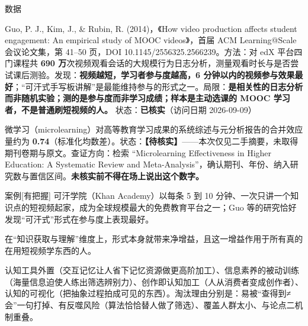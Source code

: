 \documentclass[prep,both]{debate}
\begin{document}
\begin{fields}
\begin{evidence}{数据}
\end{evidence}
\begin{bullets}
\item Guo, P. J., Kim, J., \& Rubin, R. (2014)，《How video production affects student engagement: An empirical study of MOOC videos》，首届 ACM Learning@Scale 会议论文集，第 41–50 页，DOI 10.1145/2556325.2566239。方法：对 edX 平台四门课程共 \textbf{690 万}次视频观看会话的大规模行为日志分析，测量观看时长与是否尝试课后测验。发现：\textbf{视频越短，学习者参与度越高，6 分钟以内的视频参与效果最好}；“可汗式手写板讲解”是最能维持参与的形式之一。局限：\textbf{是相关性的日志分析而非随机实验；测的是参与度而非学习成绩；样本是主动选课的 MOOC 学习者，不是普通刷短视频的人。} 状态：\textbf{已核实}（访问日期 2026-09-09）
\item 微学习（microlearning）对高等教育学习成果的系统综述与元分析报告的合并效应量约为 \textbf{0.74}（标准化均数差）。状态：\textbf{【待核实】}——本次仅见二手摘要，未取得期刊卷期与原文。查证方向：检索 “Microlearning Effectiveness in Higher Education: A Systematic Review and Meta-Analysis”，确认期刊、年份、纳入研究数与置信区间。\textbf{未核实前不得在场上说出这个数字。}
\end{bullets}
\begin{evidence}{案例}[有把握]
可汗学院（Khan Academy）以每条 5 到 10 分钟、一次只讲一个知识点的短视频起家，成为全球规模最大的免费教育平台之一；Guo 等的研究恰好发现“可汗式”形式在参与度上表现最好。
\end{evidence}
\closing[回扣判准]{在“知识获取与理解”维度上，形式本身就带来净增益，且这一增益作用于所有真的在用短视频学东西的人。}
\begin{clash}
\end{clash}
\end{fields}
认知工具外置（交互记忆让人省下记忆资源做更高阶加工）、信息素养的被动训练（海量信息迫使人练出筛选辨别力）、创作即认知加工（人从消费者变成创作者）、认知的可视化（把抽象过程拍成可见的东西）。淘汰理由分别是：易被“查得到≠会”一句打掉、有反噬风险（算法恰恰替人做了筛选）、覆盖人群太小、与论点二机制重叠。
\end{document}
